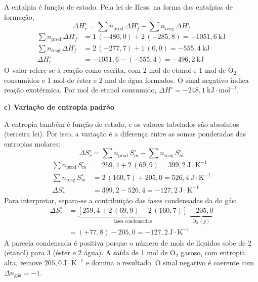 \documentclass{article}%
\begin{document}
A entalpia é função de estado. Pela lei de Hess, na forma das entalpias de formação,
\[
\Delta H^\circ_r = \sum n_{\text{prod}}\,\Delta H^\circ_f - \sum n_{\text{reag}}\,\Delta H^\circ_f
\]
\begin{align*}
\sum n_{\text{prod}}\,\Delta H^\circ_f &= 1\,(-480{,}0) + 2\,(-285{,}8) = -1051{,}6\ \text{kJ} \\
\sum n_{\text{reag}}\,\Delta H^\circ_f &= 2\,(-277{,}7) + 1\,(0{,}0) = -555{,}4\ \text{kJ} \\
\Delta H^\circ_r &= -1051{,}6 - (-555{,}4) = -496{,}2\ \text{kJ}
\end{align*}
O valor refere-se à reação como escrita, com 2 mol de etanol e 1 mol de O$_2$ consumidos e 1 mol de éster e 2 mol de água formados. O sinal negativo indica reação exotérmica. Por mol de etanol consumido, $\Delta H^\circ = -248{,}1\ \text{kJ}\cdot\text{mol}^{-1}$.

\textbf{c) Variação de entropia padrão}

A entropia também é função de estado, e os valores tabelados são absolutos (terceira lei). Por isso, a variação é a diferença entre as somas ponderadas das entropias molares:
\[
\Delta S^\circ_r = \sum n_{\text{prod}}\,S^\circ_m - \sum n_{\text{reag}}\,S^\circ_m
\]
\begin{align*}
\sum n_{\text{prod}}\,S^\circ_m &= 259{,}4 + 2\,(69{,}9) = 399{,}2\ \text{J}\cdot\text{K}^{-1} \\
\sum n_{\text{reag}}\,S^\circ_m &= 2\,(160{,}7) + 205{,}0 = 526{,}4\ \text{J}\cdot\text{K}^{-1} \\
\Delta S^\circ_r &= 399{,}2 - 526{,}4 = -127{,}2\ \text{J}\cdot\text{K}^{-1}
\end{align*}
Para interpretar, separa-se a contribuição das fases condensadas da do gás:
\begin{align*}
\Delta S^\circ_r &= \underbrace{\left[259{,}4 + 2\,(69{,}9) - 2\,(160{,}7)\right]}_{\text{fases condensadas}} \;\underbrace{-\,205{,}0}_{\text{O}_2\,(g)} \\
&= (+77{,}8) - 205{,}0 = -127{,}2\ \text{J}\cdot\text{K}^{-1}
\end{align*}
A parcela condensada é positiva porque o número de mols de líquidos sobe de 2 (etanol) para 3 (éster e 2 água). A saída de 1 mol de O$_2$ gasoso, com entropia alta, remove $205{,}0\ \text{J}\cdot\text{K}^{-1}$ e domina o resultado. O sinal negativo é coerente com $\Delta n_{\text{gás}}=-1$.
\end{document}
